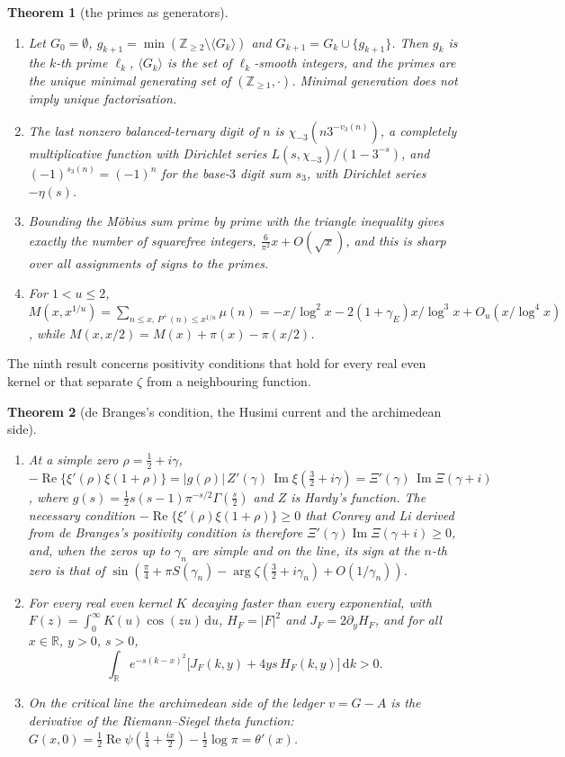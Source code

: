 \documentclass[11pt]{article}
\newtheorem{theorem}{Theorem}[section]
\theoremstyle{definition}\newtheorem{definition}[theorem]{Definition}
\theoremstyle{remark}\newtheorem{remark}[theorem]{Remark}
\newcommand{\R}{\mathbb R}\newcommand{\C}{\mathbb C}\newcommand{\N}{\mathbb N}
\newcommand{\dd}{\,\mathrm d}\newcommand{\e}{\mathrm e}
\renewcommand{\Re}{\operatorname{Re}}\renewcommand{\Im}{\operatorname{Im}}
\begin{document}
\begin{theorem}[the primes as generators]\label{mt:primes}
\begin{enumerate}[label=(\roman*)]
\item Let $G_0=\emptyset$, $g_{k+1}=\min(\mathbb Z_{\ge2}\setminus\langle G_k\rangle)$ and $G_{k+1}=G_k\cup\{g_{k+1}\}$. Then $g_k$ is the $k$-th prime $\ell_k$, $\langle G_k\rangle$ is the set of $\ell_k$-smooth integers, and the primes are the unique minimal generating set of $(\mathbb Z_{\ge1},\cdot)$. Minimal generation does not imply unique factorisation.
\item The last nonzero balanced-ternary digit of $n$ is $\chi_{-3}(n3^{-v_3(n)})$, a completely multiplicative function with Dirichlet series $L(s,\chi_{-3})/(1-3^{-s})$, and $(-1)^{s_3(n)}=(-1)^n$ for the base-$3$ digit sum $s_3$, with Dirichlet series $-\eta(s)$.
\item Bounding the M\"obius sum prime by prime with the triangle inequality gives exactly the number of squarefree integers, $\frac6{\pi^2}x+O(\sqrt x)$, and this is sharp over all assignments of signs to the primes.
\item For $1<u\le2$, $M(x,x^{1/u})=\sum_{n\le x,\,P^+(n)\le x^{1/u}}\mu(n)=-x/\log^2x-2(1+\gamma_E)x/\log^3x+O_u(x/\log^4x)$, while $M(x,x/2)=M(x)+\pi(x)-\pi(x/2)$.
\end{enumerate}
\end{theorem}

The ninth result concerns positivity conditions that hold for every real even kernel or that separate $\zeta$ from a neighbouring function.

\begin{theorem}[de Branges's condition, the Husimi current and the archimedean side]\label{mt:debranges}
\begin{enumerate}[label=(\roman*)]
\item At a simple zero $\rho=\frac12+i\gamma$, $-\Re\{\xi'(\rho)\xi(1+\rho)\}=|g(\rho)|\,Z'(\gamma)\,\Im\xi(\frac32+i\gamma)=\Xi'(\gamma)\,\Im\Xi(\gamma+i)$, where $g(s)=\frac12s(s-1)\pi^{-s/2}\Gamma(\frac s2)$ and $Z$ is Hardy's function. The necessary condition $-\Re\{\xi'(\rho)\xi(1+\rho)\}\ge0$ that Conrey and Li derived from de Branges's positivity condition \cite{CL} is therefore $\Xi'(\gamma)\Im\Xi(\gamma+i)\ge0$, and, when the zeros up to $\gamma_n$ are simple and on the line, its sign at the $n$-th zero is that of $\sin(\frac\pi4+\pi S(\gamma_n)-\arg\zeta(\frac32+i\gamma_n)+O(1/\gamma_n))$.
\item For every real even kernel $K$ decaying faster than every exponential, with $F(z)=\int_0^\infty K(u)\cos(zu)\dd u$, $H_F=|F|^2$ and $J_F=2\partial_yH_F$, and for all $x\in\R$, $y>0$, $s>0$,
\[
\int_\R e^{-s(k-x)^2}\bigl[J_F(k,y)+4ys\,H_F(k,y)\bigr]\dd k>0 .
\]
\item On the critical line the archimedean side of the ledger $v=G-A$ is the derivative of the Riemann--Siegel theta function: $G(x,0)=\frac12\Re\psi(\frac14+\frac{ix}2)-\frac12\log\pi=\theta'(x)$.
\end{enumerate}
\end{theorem}
\end{document}
